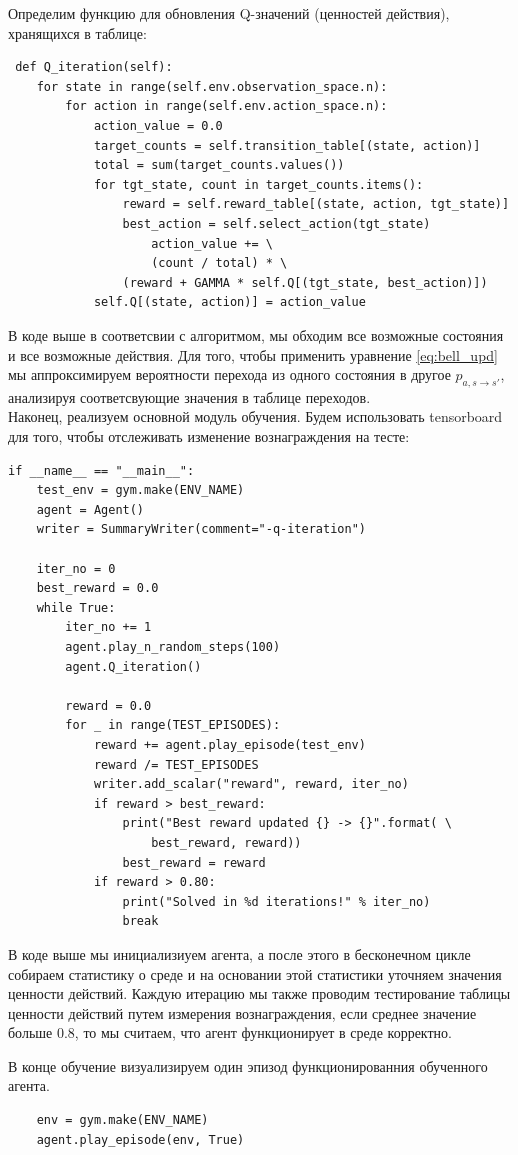 \documentclass[fleqn, a4paper, 14pt]{article}
\begin{document}
	Определим функцию для обновления Q-значений (ценностей действия), хранящихся в таблице:
\begin{lstlisting}
 def Q_iteration(self):
	for state in range(self.env.observation_space.n):
		for action in range(self.env.action_space.n):
			action_value = 0.0
			target_counts = self.transition_table[(state, action)]
			total = sum(target_counts.values())
			for tgt_state, count in target_counts.items():
				reward = self.reward_table[(state, action, tgt_state)]
				best_action = self.select_action(tgt_state)
					action_value += \
					(count / total) * \
				(reward + GAMMA * self.Q[(tgt_state, best_action)])
			self.Q[(state, action)] = action_value
	\end{lstlisting}
В коде выше в соответсвии с алгоритмом, мы обходим все возможные состояния и все возможные действия. Для того, чтобы применить уравнение \eqref{eq:bell_upd} мы аппроксимируем вероятности перехода из одного состояния в другое $ p_{a,s \rightarrow s'} $,  анализируя соответсвующие значения в таблице переходов. \\

Наконец, реализуем основной модуль обучения. Будем использовать tensorboard для того, чтобы отслеживать изменение вознаграждения на тесте:
\begin{lstlisting}
if __name__ == "__main__":
	test_env = gym.make(ENV_NAME)
	agent = Agent()
	writer = SummaryWriter(comment="-q-iteration")
	
	iter_no = 0
	best_reward = 0.0
	while True:
		iter_no += 1
		agent.play_n_random_steps(100)
		agent.Q_iteration()
		
		reward = 0.0
		for _ in range(TEST_EPISODES):
			reward += agent.play_episode(test_env)
			reward /= TEST_EPISODES
			writer.add_scalar("reward", reward, iter_no)
			if reward > best_reward:
				print("Best reward updated {} -> {}".format( \
					best_reward, reward))
				best_reward = reward
			if reward > 0.80:
				print("Solved in %d iterations!" % iter_no)
				break
\end{lstlisting}

В коде выше мы инициализиуем агента, а после этого в бесконечном цикле собираем статистику о среде и на основании этой статистики уточняем значения ценности действий. Каждую итерацию мы также проводим тестирование таблицы ценности действий путем измерения вознаграждения, если среднее значение больше 0.8, то мы считаем, что агент функционирует в среде корректно.

В конце обучение визуализируем один эпизод функционированния обученного агента.
\begin{lstlisting}
    env = gym.make(ENV_NAME)
    agent.play_episode(env, True)
\end{lstlisting}
\end{document}
